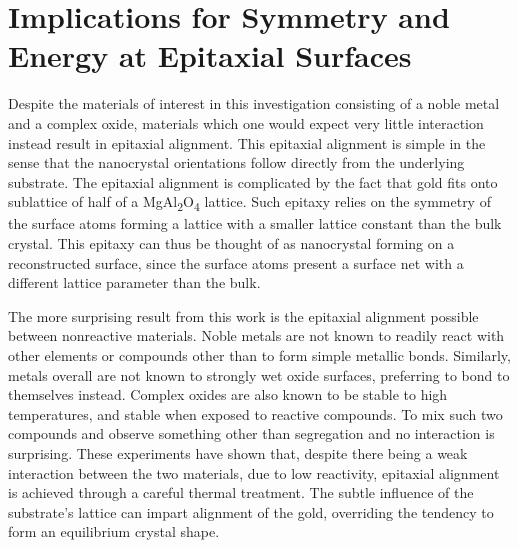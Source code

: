 \section{Implications for Symmetry and Energy at Epitaxial Surfaces}
Despite the materials of interest in this investigation consisting of a noble metal and a complex oxide, materials which one would expect very little interaction instead result in epitaxial alignment.
This epitaxial alignment is simple in the sense that the nanocrystal orientations follow directly from the underlying substrate.
The epitaxial alignment is complicated by the fact that gold fits onto sublattice of half of a MgAl\textsubscript{2}O\textsubscript{4} lattice.
Such epitaxy relies on the symmetry of the surface atoms forming a lattice with a smaller lattice constant than the bulk crystal.
This epitaxy can thus be thought of as nanocrystal forming on a reconstructed surface, since the surface atoms present a surface net with a different lattice parameter than the bulk.

The more surprising result from this work is the epitaxial alignment possible between nonreactive materials.
Noble metals are not known to readily react with other elements or compounds other than to form simple metallic bonds.
Similarly, metals overall are not known to strongly wet oxide surfaces, preferring to bond to themselves instead.
Complex oxides are also known to be stable to high temperatures, and stable when exposed to reactive compounds.
To mix such two compounds and observe something other than segregation and no interaction is surprising.
These experiments have shown that, despite there being a weak interaction between the two materials, due to low reactivity, epitaxial alignment is achieved through a careful thermal treatment.
The subtle influence of the substrate's lattice can impart alignment of the gold, overriding the tendency to form an equilibrium crystal shape.
